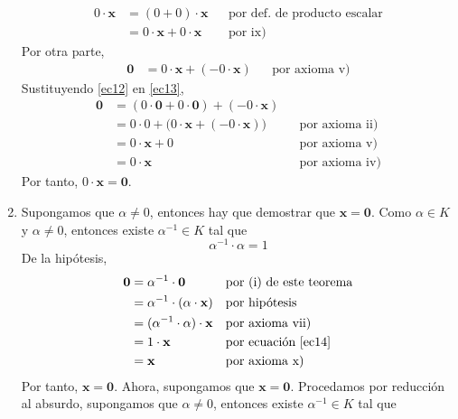 \begin{theorem}{}{}
\begin{enumerate}[label=\roman*., topsep=6pt, itemsep=0pt]
        \begin{align}
            0 \cdot \mathbf{x} & = (0 + 0) \cdot \mathbf{x} && \text{por def. de producto escalar} \label{ec11} \\
            & = 0 \cdot \mathbf{x} + 0 \cdot \mathbf{x} && \text{por ix)} \label{ec12}
        \end{align}
        Por otra parte,
        \begin{align}
            \mathbf{0} & = 0 \cdot \mathbf{x} + (-0 \cdot \mathbf{x}) && \text{por axioma v)} \label{ec13}
        \end{align}
        Sustituyendo \eqref{ec12} en \eqref{ec13},
        \begin{align*}
            \mathbf{0} & = (0 \cdot \mathbf{0} + 0 \cdot \mathbf{0}) + (-0 \cdot \mathbf{x}) \\
            & = 0 \cdot 0 + \big( 0 \cdot \mathbf{x} + (-0 \cdot \mathbf{x}) \big) && \text{por axioma ii)} \\
            & = 0 \cdot \mathbf{x} + 0 && \text{por axioma v)} \\
            & = 0 \cdot \mathbf{x} && \text{por axioma iv)}
        \end{align*}
        Por tanto, $0 \cdot \mathbf{x} = \mathbf{0}$.
        \item Supongamos que $\alpha \neq 0$, entonces hay que demostrar que $\mathbf{x} = \mathbf{0}$. Como $\alpha \in K$ y $\alpha \neq 0$, entonces existe $\alpha^{-1} \in K$ tal que
        \begin{equation}
            \alpha^{-1} \cdot \alpha = 1 \label{ec14}
        \end{equation}
        De la hipótesis,
        \begin{align*}
            \mathbf{0} & = \alpha^{-1} \cdot \mathbf{0} && \text{por (i) de este teorema} \\
            & = \alpha^{-1} \cdot (\alpha \cdot \mathbf{x}) && \text{por hipótesis} \\
            & = (\alpha^{-1} \cdot \alpha) \cdot \mathbf{x} && \text{por axioma vii)} \\
            & = 1 \cdot \mathbf{x} && \text{por ecuación \eqref{ec14}} \\
            & = \mathbf{x} && \text{por axioma x)}
        \end{align*}
        Por tanto, $\mathbf{x} = \mathbf{0}$. Ahora, supongamos que $\mathbf{x} = \mathbf{0}$. Procedamos por reducción al absurdo, supongamos que $\alpha \neq 0$, entonces existe $\alpha^{-1} \in K$ tal que

\end{enumerate}
\end{theorem}
